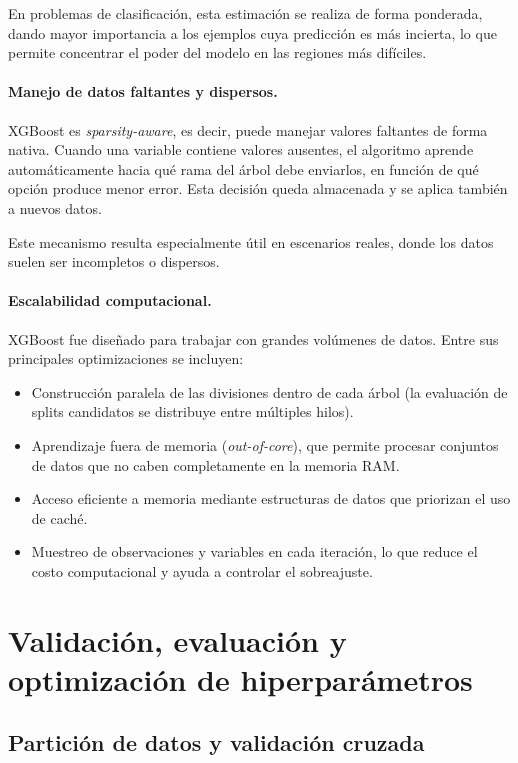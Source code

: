 En problemas de clasificación, esta estimación se realiza de forma ponderada,
dando mayor importancia a los ejemplos cuya predicción es más incierta, lo que
permite concentrar el poder del modelo en las regiones más difíciles.

\paragraph{Manejo de datos faltantes y dispersos.}
XGBoost es \textit{sparsity-aware}, es decir, puede manejar valores faltantes de
forma nativa. Cuando una variable contiene valores ausentes, el algoritmo
aprende automáticamente hacia qué rama del árbol debe enviarlos, en función
de qué opción produce menor error. Esta decisión queda almacenada y se aplica
también a nuevos datos.

Este mecanismo resulta especialmente útil en escenarios reales, donde los
datos suelen ser incompletos o dispersos.

\paragraph{Escalabilidad computacional.}
XGBoost fue diseñado para trabajar con grandes volúmenes de datos. Entre sus
principales optimizaciones se incluyen:

\begin{itemize}
  \item Construcción paralela de las divisiones dentro de cada árbol (la evaluación de splits candidatos se distribuye entre múltiples hilos).
  \item Aprendizaje fuera de memoria (\textit{out-of-core}), que permite
  procesar conjuntos de datos que no caben completamente en la memoria RAM.
  \item Acceso eficiente a memoria mediante estructuras de datos que
  priorizan el uso de caché.
  \item Muestreo de observaciones y variables en cada iteración, lo que reduce
  el costo computacional y ayuda a controlar el sobreajuste.
\end{itemize}

\section{Validación, evaluación y optimización de hiperparámetros}
\label{sec:validacion_evaluacion}

\subsection{Partición de datos y validación cruzada}

